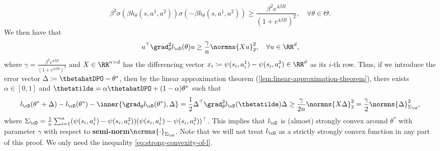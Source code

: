 \begin{equation}\label{eq:lower-bound-dpo-loss-coef}
    \beta^2\sigma(\beta h_\theta(s,a^1,a^2))\sigma(-\beta h_\theta(s,a^1,a^2)) \geq \frac{\beta^2 e^{4\beta B}}{(1+e^{4\beta B})^2}, \quad \forall \theta\in\Theta.
\end{equation}
We then have that
\begin{equation*}
    u^{\top} \grad_\theta^2 l_{\cD}(\theta)u \geq \frac{\gamma}{n}\normns{Xu}_2^2, \quad\forall u\in\RR^d,
\end{equation*}
where $\gamma=\frac{\beta^2 e^{4\beta B}}{(1+e^{4\beta B})^2}$ and $X\in\RR^{n\times d}$ has the differencing vector $x_i\coloneqq \psi(s_i,a^1_i)-\psi(s_i,a_i^2)\in\RR^d$ as its $i$-th row. Thus, if we introduce the error vector $\Delta\coloneqq \thetahatDPO-\theta^*$, then by the linear approximation theorem (\cref{lem:linear-approximation-theorem}), there exists $\alpha\in[0,1]$ and $\thetatilde=\alpha\thetahatDPO+(1-\alpha)\theta^*$ such that
 \begin{equation}\label{eq:strong-convexity-of-l}
     l_{\cD}(\theta^*+\Delta) - l_{\cD}(\theta^*) - \inner{\grad_\theta l_{\cD}(\theta^*), \Delta} = \frac{1}{2}\Delta^{\top}\grad_\theta^2 l_{\cD}(\thetatilde) \Delta \geq \frac{\gamma}{2n}\normns{X\Delta}^2_2 = \frac{\gamma}{2}\normns{\Delta}^2_{\Sigma_{\cD}},
 \end{equation}
where $\Sigma_{\cD} = \frac{1}{n}\sum_{i=1}^n(\psi(s_i,a^1_i)-\psi(s_i,a_i^2))(\psi(s_i,a^1_i)-\psi(s_i,a_i^2))^{\top}$. This implies that $l_{\cD}$ is (almost) strongly convex around $\theta^*$ with parameter $\gamma$ with respect to \textbf{semi-norm}$ \normns{\cdot}_{\Sigma_{\cD}}$. Note that we will not treat $l_{\cD}$ as a strictly strongly convex function in any part of this proof. We only need the inequality \cref{eq:strong-convexity-of-l}.

